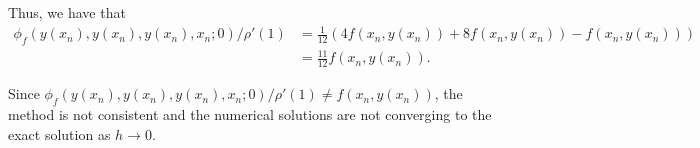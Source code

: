 \begin{solution}
  Thus, we have that
  \begin{align*}
    \phi_f(y(x_n), y(x_n), y(x_n), x_n; 0)/\rho'(1)
    &= \tfrac{1}{12}(4f(x_n,y(x_n)) + 8f(x_n, y(x_n)) - f(x_n, y(x_n))) \\
    &= \tfrac{11}{12}f(x_n,y(x_n)).
  \end{align*}
  
  Since $\phi_f(y(x_n), y(x_n), y(x_n), x_n; 0)/\rho'(1) \neq f(x_n,y(x_n))$, the method is not consistent and the numerical solutions are not converging to the exact solution as $h \to 0$.
\end{solution}
